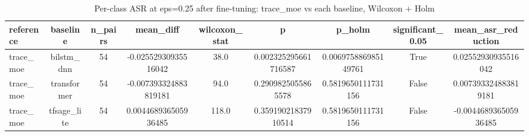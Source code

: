 \begin{table}[htbp]
\centering
\caption{Per-class ASR at eps=0.25 after fine-tuning: trace_moe vs each baseline, Wilcoxon + Holm}
\label{tab:robustness_asr_tests}
\begin{tabular}{lcccccccc}
\toprule
reference & baseline & n\_pairs & mean\_diff & wilcoxon\_stat & p & p\_holm & significant\_0.05 & mean\_asr\_reduction \\
\midrule
trace\_moe & bilstm\_dnn & 54 & -0.02552930935516042 & 38.0 & 0.002325295661716587 & 0.006975886985149761 & True & 0.02552930935516042 \\
trace\_moe & transformer & 54 & -0.007393324883819181 & 94.0 & 0.2909825055865578 & 0.5819650111731156 & False & 0.007393324883819181 \\
trace\_moe & tfsage\_lite & 54 & 0.004468936505936485 & 118.0 & 0.35919021837910514 & 0.5819650111731156 & False & -0.004468936505936485 \\
\bottomrule
\end{tabular}
\end{table}